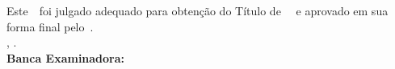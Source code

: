 \imprimircapa

\imprimirfolhaderosto*

\begin{fichacatalografica}
	
\end{fichacatalografica}

\begin{folhadeaprovacao}
	\OnehalfSpacing
	\centering
	\imprimirautor\\%
	\vspace*{10pt}		
	\textbf{\imprimirtitulo}%
	\ifnotempty{\imprimirsubtitulo}{:~\imprimirsubtitulo}\\%
	\vspace*{\baselineskip}
	Este~\imprimirtipotrabalho~foi julgado adequado para obtenção do Título de ~\imprimirformacao~e aprovado em sua forma final pelo~\imprimirprograma. \\
		\vspace*{\baselineskip}
	\imprimirlocal, \imprimirdata. \\
	\vspace*{2\baselineskip}
	\vspace*{2\baselineskip}
	\textbf{Banca Examinadora:} \\
	\vspace*{\baselineskip}
	\assinatura{\OnehalfSpacing\imprimirorientador \\ \imprimirorientadorRotulo}
	\vspace*{\baselineskip}

	\vspace*{\baselineskip}


\end{folhadeaprovacao}

